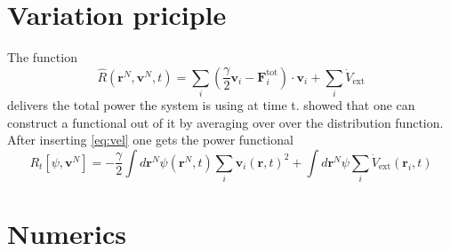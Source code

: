 \documentclass[a4paper]{article}
\renewcommand\vec[1]{\mathbf{#1}}
\begin{document}
\section{Variation priciple}
The function 
\begin{equation}
	\hat{R}\left( \vec{r}^N,\vec{v}^N,t \right) = \sum_{i} \left( \frac{ \gamma}{2} \vec{v}_i - \vec{F}_i^{\mathrm{tot}} \right) \cdot \vec{v}_i + \sum_{i} \dot{V}_{\mathrm{ext}} 
	\label{eq:Rhat}
\end{equation}
delivers the total power the system is using at time t. %
\cite{MS100} showed that one can construct a functional out of it by averaging over over the distribution function. %
After inserting \cref{eq:vel} one gets the power functional
\begin{equation}
	R_t\left[ \psi,\vec{v}^N \right]=- \frac{ \gamma}{2} \int{} d \vec{r}^N \psi\left( \vec{r}^N,t \right) \sum_i \vec{v}_i\left( \vec{r},t \right)^2 + \int{} d \vec{r}^N \psi \sum_i \dot{V}_{\mathrm{ext}}\left( \vec{r}_i,t \right)
	\label{eq:R}
\end{equation}


\section{Numerics}
\end{document}
